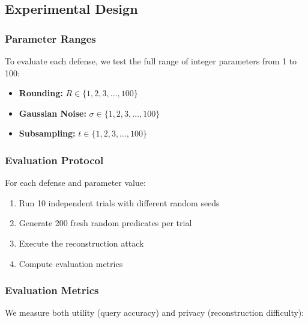 \documentclass[11pt,letterpaper]{article}
\begin{document}
\subsection{Experimental Design}

\subsubsection{Parameter Ranges}

To evaluate each defense, we test the full range of integer parameters from 1 to 100:

\begin{itemize}[leftmargin=*]
    \item \textbf{Rounding:} $R \in \{1, 2, 3, \ldots, 100\}$
    \item \textbf{Gaussian Noise:} $\sigma \in \{1, 2, 3, \ldots, 100\}$
    \item \textbf{Subsampling:} $t \in \{1, 2, 3, \ldots, 100\}$
\end{itemize}

\subsubsection{Evaluation Protocol}

For each defense and parameter value:

\begin{enumerate}[leftmargin=*]
    \item Run 10 independent trials with different random seeds
    \item Generate 200 fresh random predicates per trial
    \item Execute the reconstruction attack
    \item Compute evaluation metrics
\end{enumerate}

\subsubsection{Evaluation Metrics}

We measure both utility (query accuracy) and privacy (reconstruction difficulty):
\end{document}
